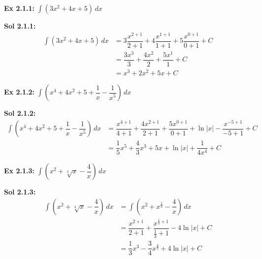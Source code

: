 \begin{tcolorbox}[example]
    \textbf{Ex 2.1.1: } $\int \left(3x^2 + 4x + 5\right) \, dx$
\end{tcolorbox}
\begin{tcolorbox}[solution]
    \textbf{Sol 2.1.1: } \begin{align*}
        \int \left(3x^2 + 4x + 5\right) \, dx &= 3\dfrac{x^{2 + 1}}{2 + 1} + 4\dfrac{x^{1 + 1}}{1 + 1} + 5\dfrac{x^{0 + 1}}{0 + 1} + C \\[11pt]
        & = \dfrac{3x^3}{3} + \dfrac{4x^2}{2} + \dfrac{5x^1}{1} + C \\[11pt]
        & = \boxed{x^3 + 2x^2 + 5x + C}
    \end{align*}
\end{tcolorbox} \vspace{11pt}

\begin{tcolorbox}[example]
    \textbf{Ex 2.1.2: } $\int \left(x^4 + 4x^2 + 5 + \dfrac{1}{x} - \dfrac{1}{x^5}\right) \, dx$
\end{tcolorbox}
\begin{tcolorbox}[solution]
    \textbf{Sol 2.1.2: } \begin{align*}
        \int \left(x^4 + 4x^2 + 5 + \dfrac{1}{x} - \dfrac{1}{x^5}\right) \, dx &= \dfrac{x^{4 + 1}}{4 + 1} + \dfrac{4x^{2 + 1}}{2 + 1} + \dfrac{5x^{0 + 1}}{0 + 1} + \ln |x| - \dfrac{x^{-5 + 1}}{-5 + 1} + C \\[11pt]
        & = \boxed{\dfrac{1}{5}x^5 + \dfrac{4}{3}x^3 + 5x + \ln |x| + \dfrac{1}{4x^4} + C}
    \end{align*}
\end{tcolorbox} \vspace{11pt}

\begin{tcolorbox}[example]
    \textbf{Ex 2.1.3: } $\int \left(x^2 + \sqrt[3]{x} - \dfrac{4}{x}\right) \, dx$
\end{tcolorbox}
\begin{tcolorbox}[solution]
    \textbf{Sol 2.1.3: } \begin{align*}
        \int \left(x^2 + \sqrt[3]x - \dfrac{4}{x}\right) \, dx &= \int \left(x^2 + x^{\frac{1}{3}} - \dfrac{4}{x}\right) \, dx \\[11pt]
        & = \dfrac{x^{2 + 1}}{2 + 1} + \dfrac{x^{\frac{1}{3} + 1}}{\frac{1}{3} + 1 } - 4\ln |x| + C \\[11pt]
        & = \boxed{\dfrac{1}{3}x^3 - \dfrac{3}{4}x^{\frac{4}{3}} + 4\ln |x| + C}
    \end{align*}
\end{tcolorbox} 

